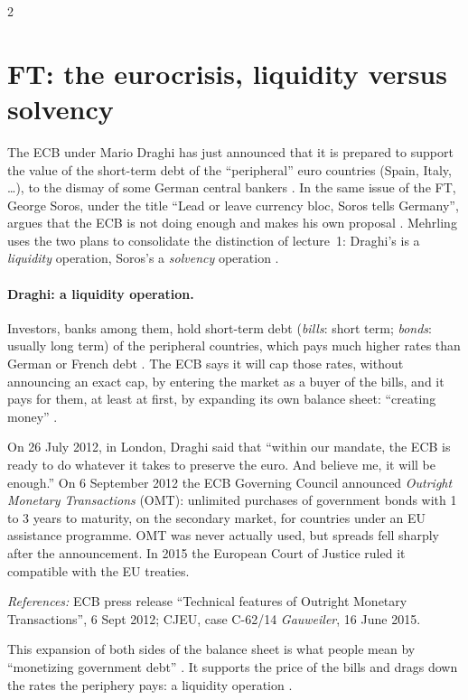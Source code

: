 \begin{paracol}{2}
\section{FT: the eurocrisis, liquidity versus solvency}\label{sec:nh-ft}

\begin{casestudy}
The ECB under Mario Draghi has just announced that it is prepared to support the value of the short-term debt
of the ``peripheral'' euro countries (Spain, Italy, \dots), to the dismay of some German central bankers
. In the same issue of the FT, George Soros, under the title ``Lead or leave currency bloc,
Soros tells Germany'', argues that the ECB is not doing enough and makes his own proposal .
Mehrling uses the two plans to consolidate the distinction of lecture~1: Draghi's is a \emph{liquidity}
operation, Soros's a \emph{solvency} operation .
\end{casestudy}

\paragraph{Draghi: a liquidity operation.} Investors, banks among them, hold short-term debt (\emph{bills}: short
term; \emph{bonds}: usually long term) of the peripheral countries, which pays much higher rates than German or
French debt . The ECB says it will cap those rates, without announcing an exact cap, by
entering the market as a buyer of the bills, and it pays for them, at least at first, by expanding its own balance
sheet: ``creating money'' .
\begin{taccts}
\qquad
{}
\end{taccts}
\begin{history}
On 26 July 2012, in London, Draghi said that ``within our mandate, the ECB is ready to do whatever it takes to
preserve the euro. And believe me, it will be enough.'' On 6 September 2012 the ECB Governing Council announced
\emph{Outright Monetary Transactions} (OMT): unlimited purchases of government bonds with 1 to 3 years to maturity,
on the secondary market, for countries under an EU assistance programme. OMT was never actually used, but
spreads fell sharply after the announcement. In 2015 the European Court of Justice ruled it compatible with
the EU treaties.\par
\emph{References:} ECB press release ``Technical features of Outright Monetary Transactions'', 6 Sept 2012;
CJEU, case C-62/14 \emph{Gauweiler}, 16 June 2015.
\end{history}
\Needspace*{11cm}This expansion of both sides of the balance sheet is what people mean by ``monetizing government debt''
. It supports the price of the bills and drags down the rates the periphery pays: a liquidity
operation .


\end{paracol}

